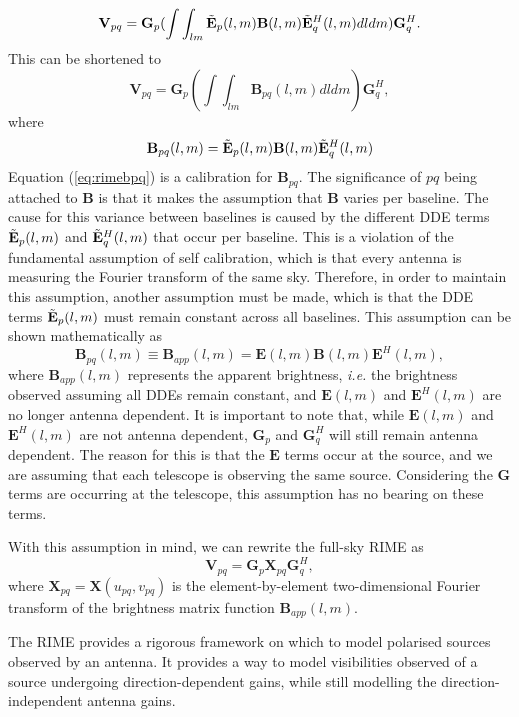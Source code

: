 \documentclass{article}
\begin{document}
\begin{equation}
\mathbf{V}_{pq} = \mathbf{G}_p (\int \int_{lm}\Tilde{\mathbf{E}}_p(l, m) \mathbf{B}(l,m) \Tilde{\mathbf{E}}^H_q(l, m) dldm) \mathbf{G}^H_q  .
\end{equation}
This can be shortened to
\begin{equation}
\label{eq:rimebpq}
\mathbf{V}_{pq} = \mathbf{G}_p (\int \int_{lm}\mathbf{B}_{pq}(l,m) dldm) \mathbf{G}^H_q ,
\end{equation}
where
\[
\mathbf{B}_{pq}(l, m) = \Tilde{\mathbf{E}}_p(l, m) \mathbf{B}(l,m) \Tilde{\mathbf{E}}^H_q(l, m)
\]
Equation (\ref{eq:rimebpq}) is a calibration for $\mathbf{B}_{pq}$. The significance of $pq$ being attached to $\mathbf{B}$ is that it makes the assumption that $\mathbf{B}$ varies per baseline. The cause for this variance between baselines is caused by the different DDE terms $\Tilde{\mathbf{E}}_p(l, m)$ and $\Tilde{\mathbf{E}}^H_q(l, m)$ that occur per baseline. This is a violation of the fundamental assumption of self calibration, which is that every antenna is measuring the Fourier transform of the same sky. Therefore, in order to maintain this assumption, another assumption must be made, which is that the DDE terms $\Tilde{\mathbf{E}}_p(l, m)$ must remain constant across all baselines. This assumption can be shown mathematically as
\[
\mathbf{B}_{pq}(l, m) \equiv \mathbf{B}_{app}(l, m) = \mathbf{E}(l, m)\mathbf{B}(l, m) \mathbf{E}^H(l, m) ,
\]
where $\mathbf{B}_{app}(l, m)$ represents the apparent brightness, \textit{i.e.} the brightness observed assuming all DDEs remain constant, and $\mathbf{E}(l, m)$ and $\mathbf{E}^H(l, m)$ are no longer antenna dependent. It is important to note that, while $\mathbf{E}(l, m)$ and $\mathbf{E}^H(l, m)$ are not antenna dependent, $\mathbf{G}_{p}$ and $\mathbf{G}^H_q$ will still remain antenna dependent. The reason for this is that the $\mathbf{E}$ terms occur at the source, and we are assuming that each telescope is observing the same source. Considering the $\mathbf{G}$ terms are occurring at the telescope, this assumption has no bearing on these terms.

With this assumption in mind, we can rewrite the full-sky RIME as 
\begin{equation}
\mathbf{V}_{pq} = \mathbf{G}_{p} \mathbf{X}_{pq} \mathbf{G}^H_q ,
\end{equation}
where $\mathbf{X}_{pq} = \mathbf{X}(u_{pq}, v_{pq})$ is the element-by-element two-dimensional Fourier transform of the brightness matrix function $\mathbf{B}_{app}(l, m)$.

The RIME provides a rigorous framework on which to model polarised sources observed by an antenna. It provides a way to model visibilities observed of a source undergoing direction-dependent gains, while still modelling the direction-independent antenna gains. 



\end{document}
